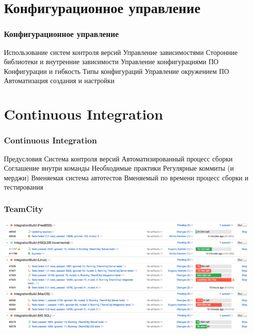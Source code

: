 \documentclass{../../slides-style}
\begin{document}
    \section{Конфигурационное управление}

    \begin{frame}
        \frametitle{Конфигурационное управление}
        \begin{outline}
            \1 Использование систем контроля версий
            \1 Управление зависимостями
                \2 Сторонние библиотеки и внутренние зависимости
            \1 Управление конфигурациями ПО
                \2 Конфигурации и гибкость
                \2 Типы конфигураций
            \1 Управление окружением ПО
                \2 Автоматизация создания и настройки
        \end{outline}
    \end{frame}

    \section{Continuous Integration}

    \begin{frame}
        \frametitle{Continuous Integration}
        \begin{outline}
            \1 Предусловия
                \2 Система контроля версий
                \2 Автоматизированный процесс сборки
                \2 Соглашение внутри команды
            \1 Необходимые практики
                \2 Регулярные коммиты (и мерджи)
                \2 Вменяемая система автотестов
                \2 Вменяемый по времени процесс сборки и тестирования
        \end{outline}
    \end{frame}

    \begin{frame}
        \frametitle{TeamCity}
        \begin{center}
            \includegraphics[width=\textwidth]{teamCity.png}
        \end{center}
    \end{frame}
\end{document}
